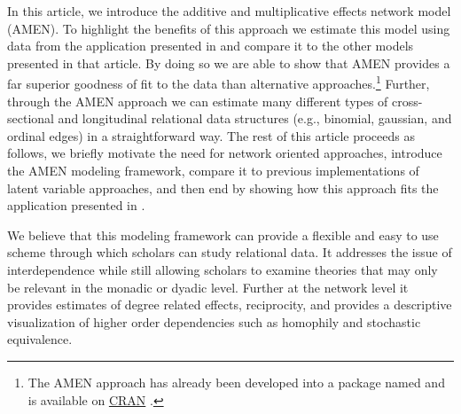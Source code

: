 In this article, we introduce the additive and multiplicative effects network model (AMEN). To highlight the benefits of this approach we estimate this model using data from  the application presented in \citet{cranmer:etal:2016} and compare it to the other models presented in that article. By doing so we are able to show that AMEN provides a far superior goodness of fit to the data than alternative approaches.\footnote{The AMEN approach has already been developed into a package named  and is available on \href{https://cran.r-project.org/web/packages/amen/index.html}{CRAN} \citep{hoff:etal:2015}.} Further, through the AMEN approach we can estimate many different types of cross-sectional and longitudinal relational data structures (e.g., binomial, gaussian, and ordinal edges) in a straightforward way. The rest of this article proceeds as follows, we briefly motivate the need for network oriented approaches, introduce the AMEN modeling framework, compare it to previous implementations of latent variable approaches, and then end by showing how this approach fits the application presented in \citet{cranmer:etal:2016}. 

We believe that this modeling framework can provide a flexible and easy to use scheme through which scholars can study relational data. It addresses the issue of interdependence while still allowing scholars to examine theories that may only be relevant in the monadic or dyadic level. Further at the network level it provides estimates of degree related effects, reciprocity, and provides a descriptive visualization of higher order dependencies such as homophily and stochastic equivalence. 




